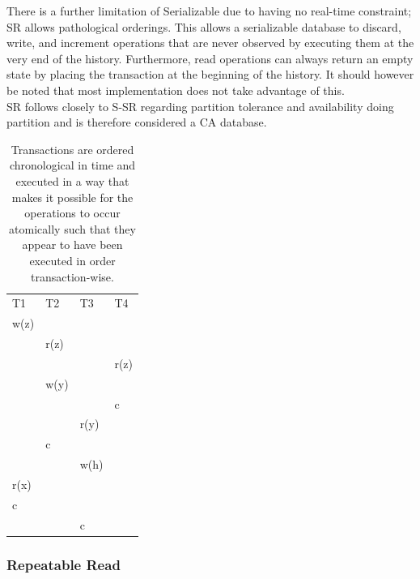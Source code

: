 \documentclass[a4paper,10pt,titlepage]{report}
\begin{document}
    There is a further limitation of Serializable due to having no real-time constraint; SR allows pathological orderings. This allows a serializable database to discard, write, and increment operations that are never observed by executing them at the very end of the history. Furthermore, read operations can always return an empty state by placing the transaction at the beginning of the history. It should however be noted that most implementation does not take advantage of this.
\\ \vspace{5mm}
    SR follows closely to S-SR regarding partition tolerance and availability doing partition and is therefore considered a CA database.
\\ \vspace{5mm}
    \begin{table}[h]
        \begin{tabular}{l|l|l|l}
            T1   & T2   & T3   & T4   \\
            w(z) &      &      &      \\
            & r(z) &      &      \\
            &      &      & r(z) \\
            & w(y) &      &      \\
            &      &      & c    \\
            &      & r(y) &      \\
            & c    &      &      \\
            &      & w(h) &      \\
            r(x) &      &      &      \\
            c    &      &      &      \\
            &      & c    &
        \end{tabular}
        \caption{Transactions are ordered chronological in time and executed in a way that makes it possible for the operations to occur atomically such that they appear to have been executed in order transaction-wise. }
    \end{table}
    \newpage

    \subsubsection{Repeatable Read}
\end{document}
